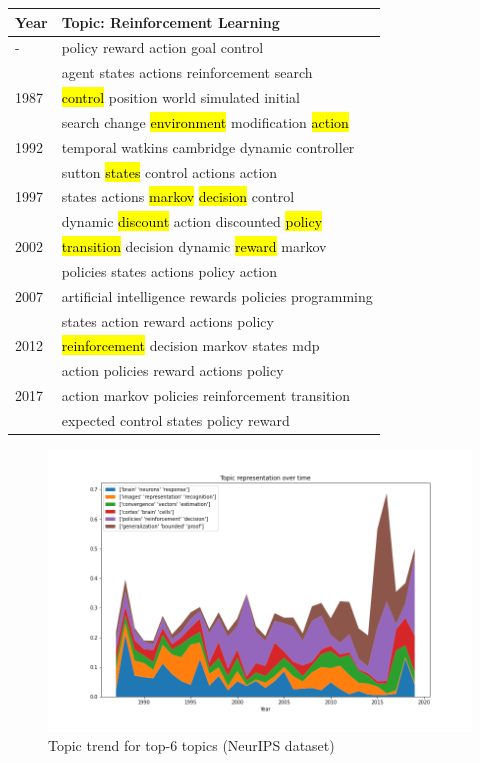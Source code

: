 \begin{table}[h]
\centering
\begin{tabular}{ll}
\hline
Year&Topic: Reinforcement Learning\\ \hline
-&policy reward action goal control \\
&agent states actions reinforcement search\\
1987 &\hl{control} position world simulated initial \\
&search change \hl{environment} modification \hl{action}\\
1992 &temporal watkins cambridge dynamic controller \\
&sutton \hl{states} control actions action\\
1997 &states actions \hl{markov} \hl{decision} control \\
&dynamic \hl{discount} action discounted \hl{policy}\\
2002 &\hl{transition} decision dynamic \hl{reward} markov \\
&policies states actions policy action\\
2007 &artiﬁcial intelligence rewards policies programming \\
&states action reward actions policy\\
2012 &\hl{reinforcement} decision markov states mdp \\
&action policies reward actions policy\\
2017 &action markov policies reinforcement transition \\
&expected control states policy reward\\
\hline
\end{tabular}
\end{table}
\begin{figure}[h]
\centering
\includegraphics[width=1\linewidth]{figures/1128/stack(2)}
\caption{Topic trend for top-6 topics (NeurIPS dataset)}
\label{fig:stack2}
\end{figure}
